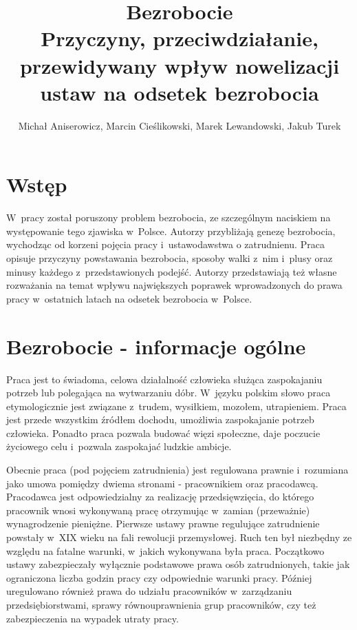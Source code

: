 \documentclass[12pt]{article}
\title{Bezrobocie \\ \Large{Przyczyny, przeciwdziałanie, przewidywany wpływ nowelizacji ustaw na odsetek bezrobocia}}
\author{Michał Aniserowicz, Marcin Cieślikowski, Marek Lewandowski, Jakub Turek}
\date{}
\begin{document}
    \maketitle
    
    \section*{Wstęp}
    
    W~pracy został poruszony problem bezrobocia, ze szczególnym naciskiem na występowanie tego zjawiska w~Polsce. Autorzy przybliżają genezę bezrobocia, wychodząc od korzeni pojęcia pracy i~ustawodawstwa o zatrudnienu. Praca opisuje przyczyny powstawania bezrobocia, sposoby walki z~nim i~plusy oraz minusy każdego z~przedstawionych podejść. Autorzy przedstawiają też własne rozważania na temat wpływu największych poprawek wprowadzonych do prawa pracy w~ostatnich latach na odsetek bezrobocia w~Polsce.
    
    \section*{Bezrobocie - informacje ogólne}
    
    Praca jest to świadoma, celowa działalność człowieka służąca zaspokajaniu potrzeb lub polegająca na wytwarzaniu dóbr\cite{ort}. W~języku polskim słowo praca etymologicznie jest związane z~trudem, wysiłkiem, mozołem, utrapieniem\cite{etym}. Praca jest przede wszystkim źródłem dochodu, umożliwia zaspokajanie potrzeb człowieka. Ponadto praca pozwala budować więzi społeczne, daje poczucie życiowego celu i~pozwala zaspokajać ludzkie ambicje. 
    
    Obecnie praca (pod pojęciem zatrudnienia) jest regulowana prawnie i~rozumiana jako umowa pomiędzy dwiema stronami - pracownikiem oraz pracodawcą. Pracodawca jest odpowiedzialny za realizację przedsięwzięcia, do którego pracownik wnosi wykonywaną pracę otrzymując w~zamian (przeważnie) wynagrodzenie pieniężne. Pierwsze ustawy prawne regulujące zatrudnienie powstały w~XIX wieku na fali rewolucji przemysłowej. Ruch ten był niezbędny ze względu na fatalne warunki, w~jakich wykonywana była praca. Początkowo ustawy zabezpieczały wyłącznie podstawowe prawa osób zatrudnionych, takie jak ograniczona liczba godzin pracy czy odpowiednie warunki pracy. Później uregulowano również prawa do udziału pracowników w~zarządzaniu przedsiębiorstwami, sprawy równouprawnienia grup pracowników, czy też zabezpieczenia na wypadek utraty pracy.
    
\end{document}

